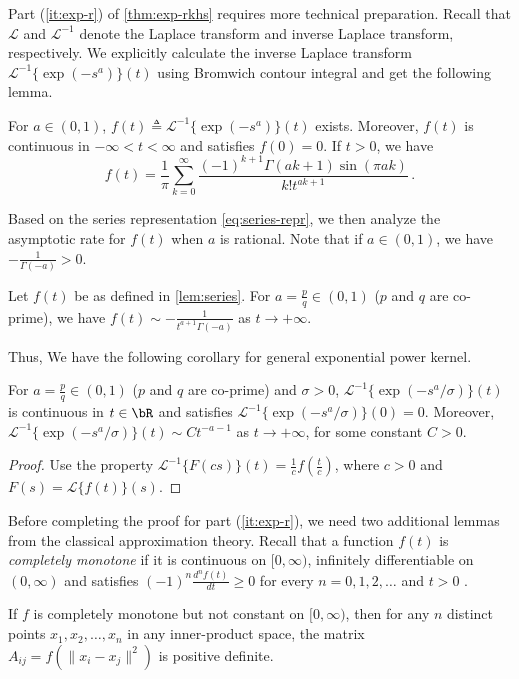 \documentclass[11pt]{article}
\newcommand{\la}{\mathscr{L}}
\begin{document}
Part (\ref{it:exp-r}) of \cref{thm:exp-rkhs} requires more technical preparation. Recall that $\la$ and $\la^{-1}$ denote the Laplace transform and inverse Laplace transform, respectively. We explicitly calculate the inverse Laplace transform $\la^{-1}\{\exp(-s^a)\}(t)$ using Bromwich contour integral and get the following lemma.

\begin{lemma}\label{lem:series}
For $a\in (0,1)$, $f(t)\triangleq \la^{-1}\{\exp(-s^a)\}(t)$ exists. Moreover, $f(t)$ is continuous in $-\infty < t< \infty$ and satisfies $f(0)=0$. If $t>0$, we have \begin{equation}\label{eq:series-repr}
f(t) = \frac{1}{\pi}\sum_{k=0}^\infty  \frac{(-1)^{k+1}\Gamma(ak+1)\sin(\pi ak)}{k! t^{ak+1}}\,.
\end{equation}
\end{lemma}

Based on the series representation \eqref{eq:series-repr}, we then analyze the asymptotic rate for $f(t)$ when $a$ is rational. Note that if $a\in (0,1)$, we have  $-\frac{1}{\Gamma(-a)}>0$. 
\begin{lemma}\label{lem:tail}
Let $f(t)$ be as defined in \cref{lem:series}.
For $a = \frac{p}{q} \in (0,1)$ ($p$ and $q$ are co-prime), we have $ f(t) \sim -\frac{1}{t^{a+1}\Gamma(-a)}$ as $t\to +\infty$.
\end{lemma}

Thus, We have the following corollary for general exponential power kernel.

\begin{cor}\label{cor:tail}
For $a = \frac{p}{q} \in (0,1)$ ($p$ and $q$ are co-prime) and $\sigma>0$, 
$\la^{-1}\{\exp(-s^a/\sigma)\}(t)$ is  continuous in $t\in \bR$ and satisfies $\la^{-1}\{\exp(-s^a/\sigma)\}(0)=0$. Moreover, 
$\la^{-1}\{\exp(-s^a/\sigma)\}(t) \sim C t^{-a-1}$ as $t\to +\infty$, for some constant $C>0$.
\end{cor}
\begin{proof}
Use the property $\la^{-1} \{ F(cs) \}(t) = \frac{1}{c} f\left(\frac{t}{c}\right)$, where $c>0$ and $F(s) = \la\{f(t)\}(s) $.
\end{proof}

Before completing the proof for part (\ref{it:exp-r}), we need two additional lemmas from the classical approximation theory. Recall that a function $f(t)$ is \emph{completely monotone} if it is continuous on $[0,\infty)$, infinitely differentiable on $(0,\infty)$ and satisfies $(-1)^n\frac{d^n f(t)}{dt}\ge 0$ for every $n=0,1,2,\dots$ and $t>0$ \citep[Chapter~14]{cheney2009course}. 
\begin{lemma}\label{lem:schoenberg}
If $f$ is completely monotone but not constant on $[0,\infty)$, 
then for any $n$ distinct points $x_1,x_2,\dots,x_n$ in any inner-product space, the matrix $A_{ij} = f(\|x_i-x_j\|^2)$ is positive definite. 
\end{lemma}
\end{document}
